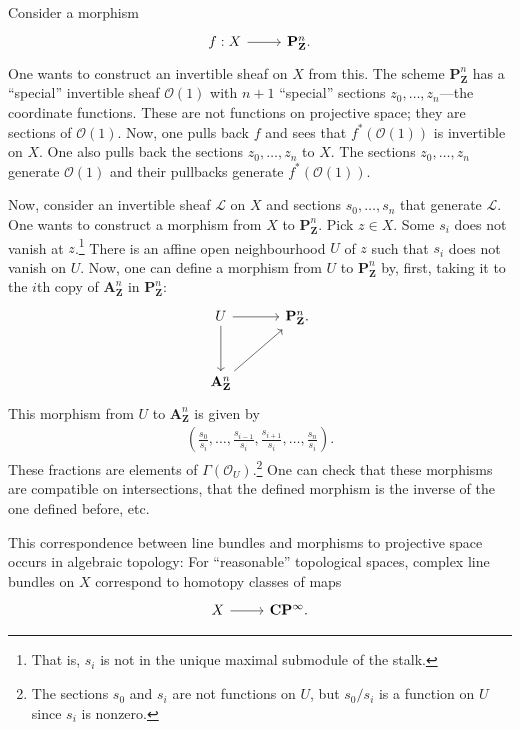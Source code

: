\documentclass [11 pt, oneside] {article}
\begin{document}
Consider a morphism
\[
\begin{tikzcd}
	f:X\ar[r] & \mathbf{P}^n_\mathbf{Z}.
\end{tikzcd}
\]
One wants to construct an invertible sheaf on $X$ from this. The scheme $\mathbf{P}^n_\mathbf{Z}$ has a ``special'' invertible sheaf $\mathscr{O}(1)$ with $n+1$ ``special'' sections $z_0,\hdots, z_n$---the coordinate functions. These are not functions on projective space; they are sections of $\mathscr{O}(1)$. Now, one pulls back $f$ and sees that $f^*(\mathscr{O}(1))$ is invertible on $X$. One also pulls back the sections $z_0,\hdots,z_n$ to $X$. The sections $z_0,\hdots,z_n$ generate $\mathscr{O}(1)$ and their pullbacks generate $f^*(\mathscr{O}(1))$.

Now, consider an invertible sheaf $\mathscr{L}$ on $X$ and sections $s_0,\hdots, s_n$ that generate $\mathscr{L}$. One wants to construct a morphism from $X$ to $\mathbf{P}^n_\mathbf{Z}$. Pick $z\in X$. Some $s_i$ does not vanish at $z$.\footnote{That is, $s_i$ is not in the unique maximal submodule of the stalk.} There is an affine open neighbourhood $U$ of $z$ such that $s_i$ does not vanish on $U$. Now, one can define a morphism from $U$ to $\mathbf{P}^n_\mathbf{Z}$ by, first, taking it to the $i$th copy of $\mathbf{A}^n_\mathbf{Z}$ in $\mathbf{P}^n_\mathbf{Z}$:
\[
\begin{tikzcd}[sep = 3 em]
	U\ar[r]\ar[d]&\mathbf{P}^n_\mathbf{Z}.\\
	\mathbf{A}^n_\mathbf{Z}\ar[ur]
\end{tikzcd}
\]
This morphism from $U$ to $\mathbf{A}^n_\mathbf{Z}$ is given by 
\begin{align*}
	\left( \frac{s_0}{s_i},\hdots, \frac{s_{i-1}}{s_i},\frac{s_{i+1}}{s_i},\hdots, \frac{s_n}{s_i} \right) .
\end{align*}
These fractions are elements of $\Gamma(\mathscr{O}_U)$.\footnote{The sections $s_0$ and $s_i$ are not functions on $U$, but $s_0/s_i$ is a function on $U$ since $s_i$ is nonzero.} 
One can check that these morphisms are compatible on intersections, that the defined morphism is the inverse of the one defined before, etc.

\begin{remark}
This correspondence between line bundles and morphisms to projective space occurs in algebraic topology: For ``reasonable'' topological spaces, complex line bundles on $X$ correspond to homotopy classes of maps 
\[
\begin{tikzcd}
	X\ar[r]& \mathbf{C}\mathbf{P}^\infty.
\end{tikzcd}
\]
\end{remark}
\end{document}
